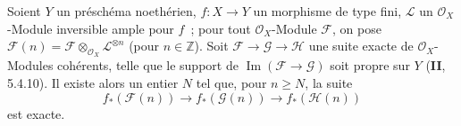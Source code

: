 \begin{corollary}[2.2.4]
\label{III.2.2.4-fr}
Soient $Y$ un préschéma noethérien, $f:X\to Y$ un morphisme de type fini,
$\mathcal L$ un $\mathcal O_X$-Module inversible ample pour $f$~; pour
tout $\mathcal O_X$-Module $\mathcal F$, on pose
$\mathcal F(n)=\mathcal F\otimes_{\mathcal O_X}\mathcal L^{\otimes n}$
(pour $n\in\mathbb Z$). Soit
$\mathcal F\to\mathcal G\to\mathcal H$ une suite exacte de
$\mathcal O_X$-Modules cohérents,
telle que le support de
$\operatorname{Im}(\mathcal F\to\mathcal G)$ soit propre sur $Y$ \textup{(\textbf{II}, 5.4.10)}. Il existe alors
un entier $N$ tel que, pour $n\geq N$, la suite
\[
f_*(\mathcal F(n))\longrightarrow f_*(\mathcal G(n))
\longrightarrow f_*(\mathcal H(n))
\]
est exacte.
\end{corollary}

